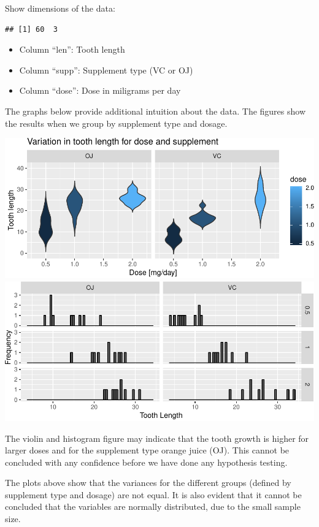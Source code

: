 \documentclass[]{article}
\providecommand{\tightlist}{%
  \setlength{\itemsep}{0pt}\setlength{\parskip}{0pt}}
\begin{document}
Show dimensions of the data:

\begin{verbatim}
## [1] 60  3
\end{verbatim}

\begin{itemize}
\tightlist
\item
  Column ``len'': Tooth length
\item
  Column ``supp'': Supplement type (VC or OJ)
\item
  Column ``dose'': Dose in miligrams per day
\end{itemize}

The graphs below provide additional intuition about the data. The
figures show the results when we group by supplement type and dosage.

\includegraphics{Basic_Inferential_Data_Analysis_-_Tooth_Growth_files/figure-latex/unnamed-chunk-4-1.pdf}
\includegraphics{Basic_Inferential_Data_Analysis_-_Tooth_Growth_files/figure-latex/unnamed-chunk-4-2.pdf}

The violin and histogram figure may indicate that the tooth growth is
higher for larger doses and for the supplement type orange juice (OJ).
This cannot be concluded with any confidence before we have done any
hypothesis testing.

The plots above show that the variances for the different groups
(defined by supplement type and dosage) are not equal. It is also
evident that it cannot be concluded that the variables are normally
distributed, due to the small sample size.
\end{document}
